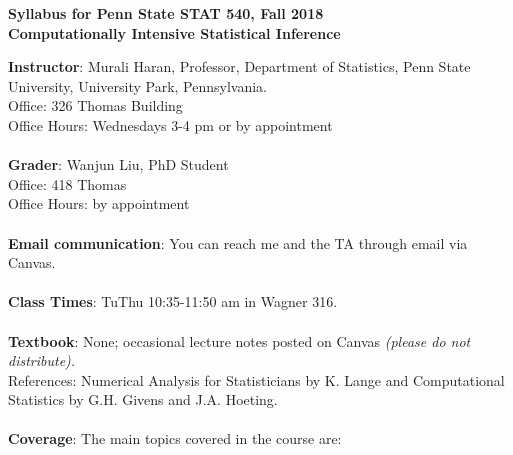 \documentclass[10pt]{article}
\begin{document}
\pagestyle{empty}
\vspace{-0.5in}
\Large
\begin{center}
{\bf Syllabus for Penn State STAT 540, Fall 2018}\\
{\bf Computationally Intensive Statistical Inference}\\
\end{center}
\normalsize {\bf Instructor}: Murali Haran, Professor, Department of Statistics, Penn State University, University Park, Pennsylvania.\\ Office: 326 Thomas
Building \\ Office
Hours: Wednesdays 3-4 pm or by appointment\\\\ 
{\bf Grader}: Wanjun Liu, PhD Student \\  Office: 418 Thomas
\hspace{2in} \:\:\:\:\:\:\:\:\\  
Office Hours: by appointment \\\\
{\bf Email communication}: You can reach me and the TA through email via Canvas.\\\\ %
{\bf Class Times}: TuThu 10:35-11:50 am in Wagner 316.\\\\
{\bf Textbook}: None; occasional lecture notes posted on Canvas {\it (please do 
 not distribute).} \\References: Numerical Analysis for Statisticians by K. Lange and Computational Statistics by G.H. Givens and J.A. Hoeting. \\\\
{\bf Coverage}: The main topics covered in the course are:
\end{document}
